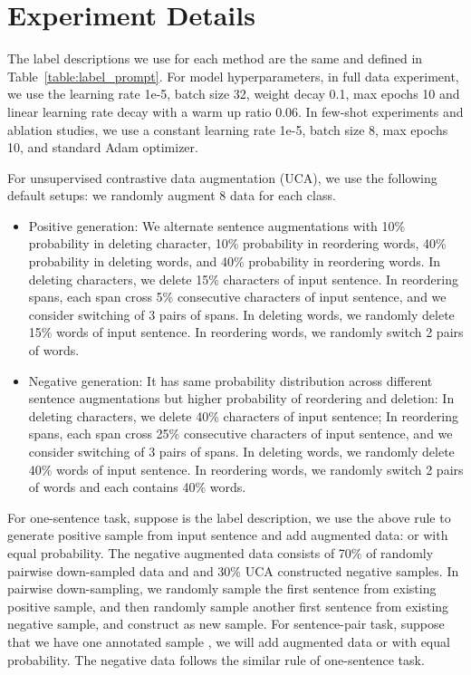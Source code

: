 \documentclass{article}
\begin{document}



\appendix
\section{Experiment Details\label{appendix:experiment}}

The label descriptions we use for each method are the same and defined in Table~\ref{table:label_prompt}. For model hyperparameters, in full data experiment, we use the learning rate 1e-5, batch size 32, weight decay 0.1, max epochs 10 and linear learning rate decay with a warm up ratio 0.06. In few-shot experiments and ablation studies, we use a constant  learning rate 1e-5, batch size 8, max epochs 10, and standard Adam optimizer.

For unsupervised contrastive data augmentation (UCA), we use the following default setups: we randomly augment 8 data for each class. 
\begin{itemize}
    \item Positive generation: We alternate sentence augmentations with 10\% probability in deleting character, 10\% probability in reordering words, 40\% probability in deleting words, and 40\% probability in reordering words. In deleting characters, we delete 15\% characters of input sentence. In reordering spans, each span cross 5\% consecutive characters of input sentence, and we consider switching of 3 pairs of spans. In deleting words, we randomly delete 15\% words of input sentence. In reordering words, we randomly switch 2 pairs of words.
    \item Negative generation: It has same probability distribution across different sentence augmentations but higher probability of reordering and deletion: In deleting characters, we delete 40\% characters of input sentence; In reordering spans, each span cross 25\% consecutive characters of input sentence, and we consider switching of 3 pairs of spans. In deleting words, we randomly delete 40\% words of input sentence. In reordering words, we randomly switch 2 pairs of words and each contains 40\% words.
\end{itemize}
For one-sentence task, suppose  is the label description, we use the above rule to generate positive sample  from input sentence  and add augmented data:  or  with equal probability. The negative augmented data consists of 70\% of randomly pairwise down-sampled data and and 30\% UCA constructed negative samples. In pairwise down-sampling, we randomly sample the first sentence  from existing positive sample, and then randomly sample another first sentence  from existing negative sample, and construct  as new sample. For sentence-pair task, suppose that we have one annotated sample , we will add augmented data  or  with equal probability. The negative data follows the similar rule of one-sentence task.
\end{document}
